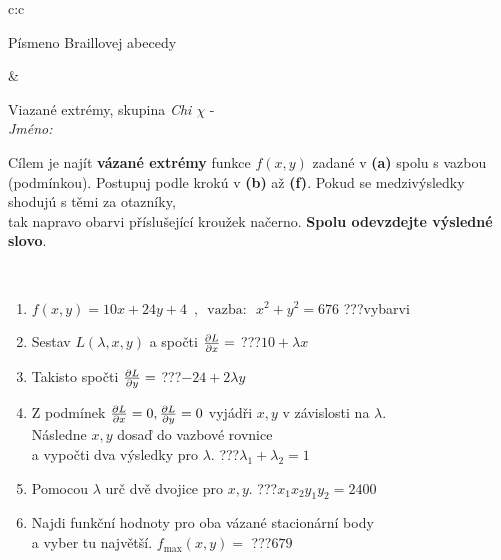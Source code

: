 \documentclass[10pt]{report}
\begin{document}
\begin{tabular}{c:c}
\begin{minipage}[c][104.5mm][t]{0.5\linewidth}
\begin{center}
\begin{minipage}{0.20\linewidth}
\begin{center}
{\small Písmeno Braillovej abecedy}
\end{center}
\end{minipage}
\end{center}
\end{minipage}
&
\begin{minipage}[c][104.5mm][t]{0.5\linewidth}
\begin{center}
\vspace{7mm}
{\huge Viazané extrémy, skupina \textit{Chi $\chi$} -}\\[5mm]
\textit{Jméno:}\phantom{xxxxxxxxxxxxxxxxxxxxxxxxxxxxxxxxxxxxxxxxxxxxxxxxxxxxxxxxxxxxxxxxx}\\[5mm]
\begin{minipage}{0.95\linewidth}
\begin{center}
Cílem je najít \textbf{vázané extrémy} funkce $f(x,y)$ zadané v \textbf{(a)} spolu s vazbou (podmínkou). Postupuj podle krokú v \textbf{(b)} až \textbf{(f)}. Pokud se medzivýsledky shodujú s těmi za otazníky,\\tak napravo obarvi příslušející kroužek načerno. \textbf{Spolu odevzdejte výsledné slovo}.
\end{center}
\end{minipage}
\\[1mm]
\begin{minipage}{0.79\linewidth}
\begin{center}
\begin{varwidth}{\linewidth}
\begin{enumerate}
\normalsize
\item $f(x,y)=10x+24y+4 \enspace , \enspace \mathrm{vazba:} \enspace x^2+y^2=676$\quad \dotfill\; ???\;\dotfill \quad vybarvi
\item Sestav $L(\lambda,x,y)$ a spočti $\pdv{L}{x}=$\quad \dotfill\; ???\;\dotfill \quad $10+\lambda x$
\item Takisto spočti $\pdv{L}{y}=$\quad \dotfill\; ???\;\dotfill \quad $-24+2\lambda y$
\item Z podmínek $\pdv{L}{x}=0 , \pdv{L}{y}=0$ vyjádři $x,y$ v závislosti na $\lambda$.\\ \phantom{xxxxxx}Následne $x,y$ dosaď do vazbové rovnice\\ \phantom{xxxxxx}a vypočti dva výsledky pro $\lambda$.\quad \dotfill\; ???\;\dotfill \quad $\lambda_1+\lambda_2=1$
\item Pomocou $\lambda$ urč dvě dvojice pro $x,y$.\quad \dotfill\; ???\;\dotfill \quad $x_1 x_2 y_1 y_2=2400$
\item Najdi funkční hodnoty pro oba vázané stacionární body\\ \phantom{xxxxxx}a vyber tu najvětší. $f_{\text{max}}(x,y)=$\quad \dotfill\; ???\;\dotfill \quad $679$

\end{enumerate}
\end{varwidth}
\end{center}
\end{minipage}
\end{center}
\end{minipage}
\end{tabular}
\end{document}
